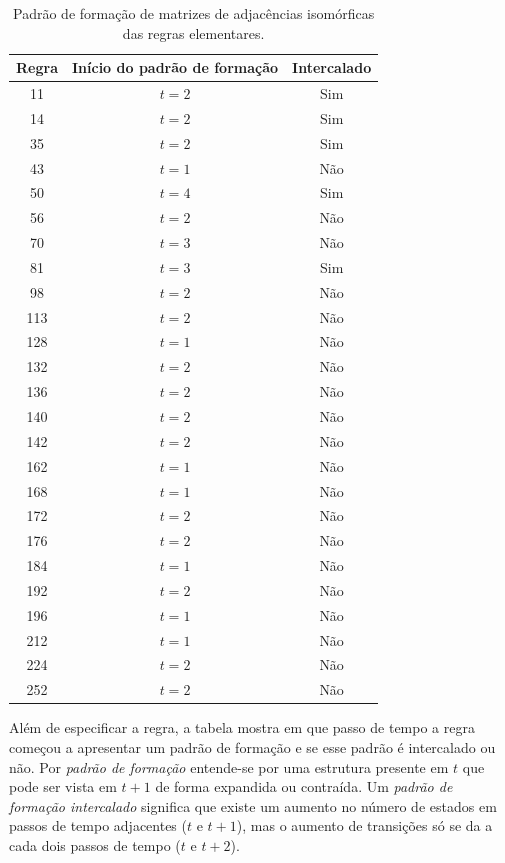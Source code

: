 \documentclass[12pt,a4paper]{article}
\begin{document}
\begin{table}[htp]
\begin{center}
\begin{tabular}{c c c}
\hline
\textbf{Regra} & \textbf{Início do padrão de formação} & \textbf{Intercalado}\\ \hline
 11 & $t=2$ & Sim \\
 14 & $t=2$ & Sim \\
 35 & $t=2$ & Sim \\
 43 & $t=1$ & Não \\
 50 & $t=4$ & Sim \\
 56 & $t=2$ & Não \\
 70 & $t=3$ & Não \\
 81 & $t=3$ & Sim \\
 98 & $t=2$ & Não \\
113 & $t=2$ & Não \\
128 & $t=1$ & Não \\
132 & $t=2$ & Não \\
136 & $t=2$ & Não \\
140 & $t=2$ & Não \\
142 & $t=2$ & Não \\
162 & $t=1$ & Não \\
168 & $t=1$ & Não \\
172 & $t=2$ & Não \\
176 & $t=2$ & Não \\
184 & $t=1$ & Não \\
192 & $t=2$ & Não \\
196 & $t=1$ & Não \\
212 & $t=1$ & Não \\
224 & $t=2$ & Não \\
252 & $t=2$ & Não \\
\end{tabular}
\caption{Padrão de formação de matrizes de adjacências isomórficas das
regras elementares.}
\label{tab:pattern}
\end{center}
\end{table}

Além de especificar a regra, a tabela mostra em que passo de tempo a regra
começou a apresentar um padrão de formação e se esse padrão é intercalado
ou não. Por \textit{padrão de formação} entende-se por uma estrutura presente em $t$ que
pode ser vista em $t+1$ de forma expandida ou contraída. Um \textit{padrão de
formação intercalado} significa que existe um aumento no número de estados
em passos de tempo adjacentes ($t$ e $t+1$), mas o aumento de transições só se
da a cada dois passos de tempo ($t$ e $t+2$).
\end{document}
